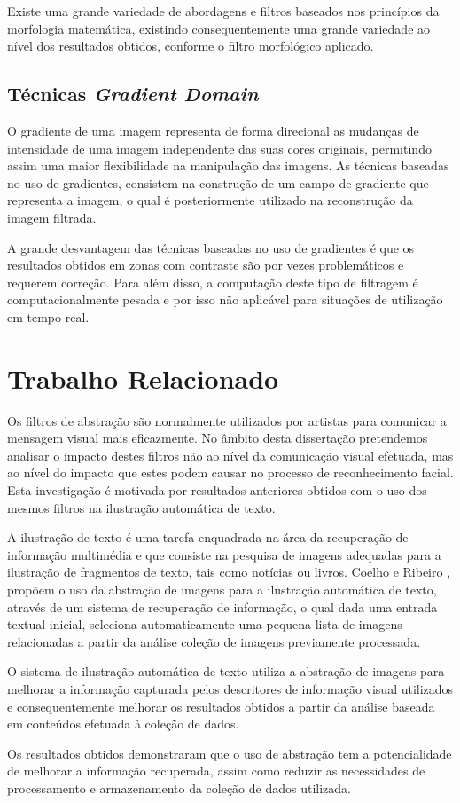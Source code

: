 Existe uma grande variedade de abordagens e filtros baseados nos princípios da morfologia matemática, existindo consequentemente uma grande variedade ao nível dos resultados obtidos, conforme o filtro morfológico aplicado.

\subsection{Técnicas \textit{Gradient Domain}}
O gradiente de uma imagem representa de forma direcional as mudanças de intensidade de uma imagem independente das suas cores originais, permitindo assim uma maior flexibilidade na manipulação das imagens. As técnicas baseadas no uso de gradientes, consistem na construção de um campo de gradiente que representa a imagem, o qual é posteriormente utilizado na reconstrução da imagem filtrada.

A grande desvantagem das técnicas baseadas no uso de gradientes é que os resultados obtidos em zonas com contraste são por vezes problemáticos e requerem correção. Para além disso, a computação deste tipo de filtragem é computacionalmente pesada e por isso não aplicável para situações de utilização em tempo real.

\section{Trabalho Relacionado}
Os filtros de abstração são normalmente utilizados por artistas para comunicar a mensagem visual mais eficazmente.  No âmbito desta dissertação pretendemos analisar o impacto destes filtros não ao nível da comunicação visual efetuada, mas ao nível do impacto que estes podem causar no processo de reconhecimento facial. Esta investigação é motivada por resultados anteriores obtidos com o uso dos mesmos filtros na ilustração automática de texto.

A ilustração de texto é uma tarefa enquadrada na área da recuperação de informação multimédia e que consiste na pesquisa de imagens adequadas para a ilustração de fragmentos de texto, tais como notícias ou livros. Coelho e Ribeiro  \cite{Coelho:2012:IAC:2260641.2260676}, propõem o uso da abstração de imagens para a ilustração automática de texto, através de um sistema de recuperação de informação, o qual dada uma entrada textual inicial, seleciona automaticamente uma pequena lista de imagens relacionadas a partir da análise coleção de imagens previamente processada.

O sistema de ilustração automática de texto utiliza a abstração de imagens para melhorar a informação capturada pelos descritores de informação visual utilizados e consequentemente melhorar os resultados obtidos a partir da análise baseada em conteúdos efetuada à coleção de dados.

Os resultados obtidos demonstraram que o uso de abstração tem a potencialidade de melhorar a informação recuperada, assim como reduzir as necessidades de processamento e armazenamento da coleção de dados utilizada.

